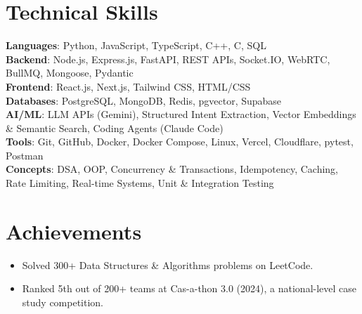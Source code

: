 \documentclass[letterpaper,11pt]{article}
\newcommand{\resumeItem}[1]{
  \item\small{{#1 \vspace{-2pt}}}
}
\newcommand{\resumeSubHeadingListStart}{\begin{itemize}[leftmargin=0.0in, label={}]}
\newcommand{\resumeSubHeadingListEnd}{\end{itemize}}
\begin{document}
\section{Technical Skills}
 \begin{itemize}[leftmargin=0.0in, label={}]
    \small{\item{
     \textbf{Languages}{: Python, JavaScript, TypeScript, C++, C, SQL} \\
     \textbf{Backend}{: Node.js, Express.js, FastAPI, REST APIs, Socket.IO, WebRTC, BullMQ, Mongoose, Pydantic} \\
     \textbf{Frontend}{: React.js, Next.js, Tailwind CSS, HTML/CSS} \\
     \textbf{Databases}{: PostgreSQL, MongoDB, Redis, pgvector, Supabase} \\
     \textbf{AI/ML}{: LLM APIs (Gemini), Structured Intent Extraction, Vector Embeddings \& Semantic Search, Coding Agents (Claude Code)} \\
     \textbf{Tools}{: Git, GitHub, Docker, Docker Compose, Linux, Vercel, Cloudflare, pytest, Postman} \\
     \textbf{Concepts}{: DSA, OOP, Concurrency \& Transactions, Idempotency, Caching, Rate Limiting, Real-time Systems, Unit \& Integration Testing}
    }}
 \end{itemize}
 \vspace{-14pt}

\section{Achievements}
 \resumeSubHeadingListStart
    \resumeItem{Solved 300+ Data Structures \& Algorithms problems on LeetCode.}
    \resumeItem{Ranked 5th out of 200+ teams at Cas-a-thon 3.0 (2024), a national-level case study competition.}
 \resumeSubHeadingListEnd
\end{document}
